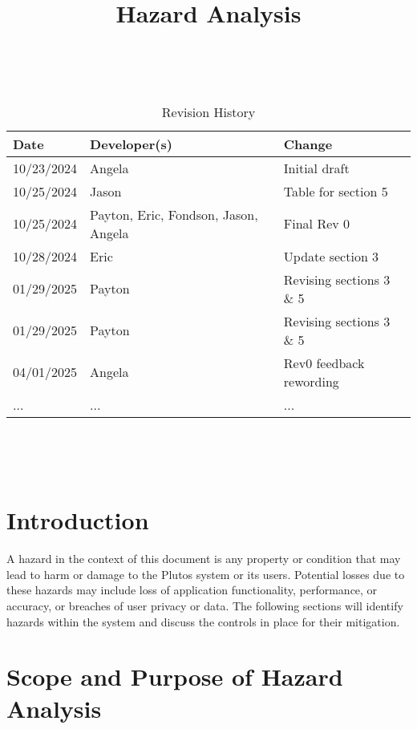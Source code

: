 \documentclass{article}
\title{Hazard Analysis\\\progname}
\author{\authname}
\date{}
\begin{document}
\maketitle
\thispagestyle{empty}

~\newpage


\begin{table}[hp]
\caption{Revision History} \label{TblRevisionHistory}
\begin{tabularx}{\textwidth}{llX}
\toprule
\textbf{Date} & \textbf{Developer(s)} & \textbf{Change}\\
\midrule
10/23/2024 & Angela & Initial draft\\
10/25/2024 & Jason & Table for section 5 \\
10/25/2024 & Payton, Eric, Fondson, Jason, Angela & Final Rev 0 \\
10/28/2024 & Eric & Update section 3\\
01/29/2025 & Payton & Revising sections 3 \& 5\\
01/29/2025 & Payton & Revising sections 3 \& 5\\
04/01/2025 & Angela & Rev0 feedback rewording\\
... & ... & ... \\
\bottomrule
\end{tabularx}
\end{table}

~\newpage

\tableofcontents

\listoftables

~\newpage


\section{Introduction}

A hazard in the context of this document is any property or condition that may
lead to harm or damage to the Plutos system or its users. Potential losses due
to these hazards may include loss of application functionality, performance, or
accuracy, or breaches of user privacy or data. The following sections will
identify hazards within the system and discuss the controls in place for their
mitigation.


\section{Scope and Purpose of Hazard Analysis}
\end{document}
